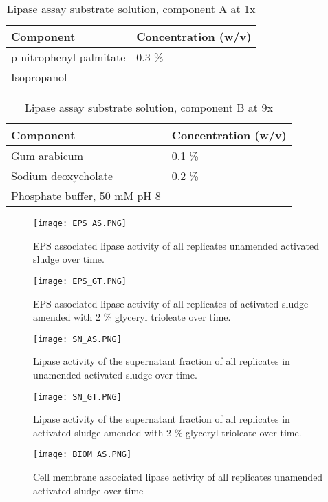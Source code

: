 \documentclass[11pt]{article}
\begin{document}
\begin{table}
\caption{Lipase assay substrate solution, component A at 1x}
\begin{tabular}{  p{6.9cm} | p{6.9cm} }
\hline
Component & Concentration (w/v) \\
\hline
 p-nitrophenyl palmitate   & 0.3 \% \\
 Isopropanol &  \\
 \hline
\end{tabular}
\end{table}

\begin{table}
\caption{Lipase assay substrate solution, component B at 9x}
\begin{tabular}{  p{6.9cm} | p{6.9cm} }
\hline
Component & Concentration (w/v) \\
\hline
 Gum arabicum & 0.1 \% \\
  Sodium deoxycholate & 0.2 \% \\
  Phosphate buffer, 50 mM pH 8   &  \\
  \hline
\end{tabular}
\end{table}

\begin{figure}
\texttt{[image: EPS\_AS.PNG]}
\caption{EPS associated lipase activity of all replicates unamended activated sludge over time.}
\end{figure}

\begin{figure}
\texttt{[image: EPS\_GT.PNG]}
\caption{EPS associated lipase activity of all replicates of activated sludge amended with 2 \% glyceryl trioleate over time.}
\end{figure}

\begin{figure}
\texttt{[image: SN\_AS.PNG]}
\caption{Lipase activity of the supernatant fraction of all replicates in unamended activated sludge over time.}
\end{figure}
\begin{figure}
\texttt{[image: SN\_GT.PNG]}
\caption{Lipase activity of the supernatant fraction of all replicates in activated sludge amended with 2 \% glyceryl trioleate over time.}
\end{figure}

\begin{figure}
\texttt{[image: BIOM\_AS.PNG]}
\caption{Cell membrane associated lipase activity of all replicates unamended activated sludge over time}
\end{figure}
\end{document}
